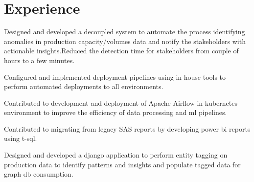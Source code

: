 \documentclass[]{deedy-resume-reversed}
\begin{document}
%
%

%
%

%
%

\begin{minipage}[t]{0.60\textwidth}


\section{Experience}
\vspace{\topsep} %
\begin{tightemize}
\item Designed and developed a decoupled system to automate the process identifying anomalies in production capacity/volumes data and notify the stakeholders with actionable insights.Reduced the detection time for stakeholders from couple of hours to a few minutes.
\item Configured and implemented deployment pipelines using in house tools to perform automated deployments to all environments.
\item Contributed to development and deployment of Apache Airflow in kubernetes environment to improve the efficiency of data processing and ml pipelines.
\item Contributed to migrating from legacy SAS reports by developing power bi reports using t-sql.
\end{tightemize}
\sectionsep

\begin{tightemize}
\item Designed and developed a django application to perform entity tagging on production data to identify patterns and insights and populate tagged data for graph db consumption.
\end{tightemize}
\sectionsep


\end{minipage}
\end{document}
